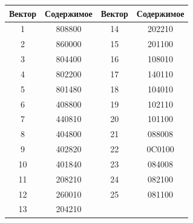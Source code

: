 \begin{table}[h]\small %


\begin{center}


\parbox{238pt}{





}





\vspace*{2ex}





\tabcolsep=8pt


\begin{tabular}{|c|c||c|c|}


\hline


\multicolumn{1}{|c|}{Вектор}&Содержимое &Вектор&Содержимое \\


\hline


1&808800&14&202210\\


2&860000&15&201100\\


3&804400&16&108010\\


4&802200&17&140110\\


5&801480&18&104010\\


6&408800&19&102110\\


7&440810&20&101100\\


8&404800&21&088008\\


9&402820&22&0C0100\\


10\hphantom{9}&401840&23&084008\\


11&208210&24&082100\\


12&260010&25&081100\\


13&204210&&\\


\hline


\end{tabular}


\end{center}


\vspace*{-12pt}


\end{table}





